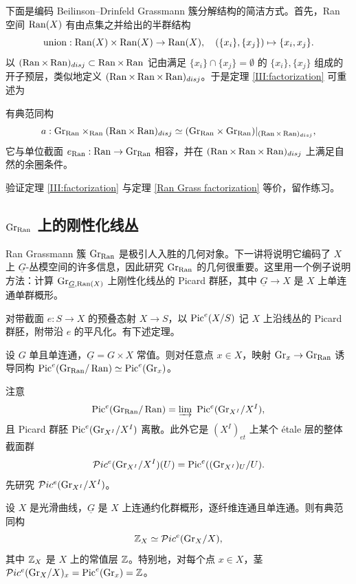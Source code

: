 下面是编码 Beilinson--Drinfeld Grassmann 簇分解结构的简洁方式。首先，Ran 空间 $\Ran(X)$ 有由点集之并给出的半群结构
\[\on{union}: \Ran(X)\times \Ran(X)\to \Ran(X),\quad (\{x_i\},\{x_j\})\mapsto \{x_i,x_j\}.\]
以 $(\Ran\times \Ran)_{disj}\subset \Ran\times\Ran$ 记由满足 $\{x_i\}\cap \{x_j\}=\emptyset$ 的 $\{x_i\},\{x_j\}$ 组成的开子预层，类似地定义 $(\Ran\times \Ran\times \Ran)_{disj}$。于是定理 \ref{III:factorization} 可重述为

\begin{thm}\label{Ran Grass factorization}
有典范同构
\[a: \Gr_{\Ran}\times_{\Ran}(\Ran\times\Ran)_{disj}\simeq (\Gr_{\Ran}\times\Gr_{\Ran})|_{(\Ran\times\Ran)_{disj}},\]
它与单位截面 $e_{\Ran}:\Ran\to\Gr_{\Ran}$ 相容，并在 $(\Ran\times\Ran\times \Ran)_{disj}$ 上满足自然的余圈条件。
\end{thm}

验证定理 \ref{III:factorization} 与定理 \ref{Ran Grass factorization} 等价，留作练习。

\subsection{$\Gr_{\Ran}$ 上的刚性化线丛}\label{line bundle on BD Grass}

Ran Grassmann 簇 $\Gr_{\Ran}$ 是极引人入胜的几何对象。下一讲将说明它编码了 $X$ 上 $\underline G$-丛模空间的许多信息，因此研究 $\Gr_{\Ran}$ 的几何很重要。这里用一个例子说明方法：计算 $\Gr_{\underline{G}, \Ran(X)}$ 上刚性化线丛的 Picard 群胚，其中 $\underline{G}\to X$ 是 $X$ 上单连通单群概形。

对带截面 $e:S\to X$ 的预叠态射 $X\to S$，以 $\Pic^e(X/S)$ 记 $X$ 上沿线丛的 Picard 群胚，附带沿 $e$ 的平凡化。有下述定理。

\begin{thm}\label{Rigid line}
设 $G$ 单且单连通，$\underline G=G\times X$ 常值。则对任意点 $x\in X$，映射 $\Gr_x\to \Gr_{\Ran}$ 诱导同构 $\Pic^e(\Gr_{\Ran}/\Ran)\simeq \Pic^e(\Gr_x)$。
\end{thm}

注意
\[\Pic^e(\Gr_{\Ran}/\Ran)=\varinjlim\ \Pic^e(\Gr_{X^I}/X^I),\]
且 Picard 群胚 $\Pic^e(\Gr_{X^I}/X^I)$ 离散。此外它是 $(X^I)_{et}$ 上某个 \'etale 层的整体截面群
\[\mP ic^e(\Gr_{X^I}/X^I)(U)= \Pic^e((\Gr_{X^I})_U/U).\]
先研究 $\mP ic^e(\Gr_{X^I}/X^I)$。

\begin{lem}
设 $X$ 是光滑曲线，$\underline G$ 是 $X$ 上连通约化群概形，逐纤维连通且单连通。则有典范同构
\[\bZ_X\simeq \mP ic^e(\Gr_X/X),\]
其中 $\bZ_X$ 是 $X$ 上的常值层 $\bZ$。特别地，对每个点 $x\in X$，茎 $\mP ic^e(\Gr_X/X)_x=\Pic^e(\Gr_x)=\bZ$。
\end{lem}

